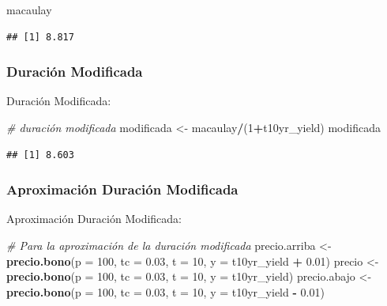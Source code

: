 \documentclass[12pt,]{book}
\newenvironment{Shaded}{\begin{snugshade}}{\end{snugshade}}
\newcommand{\KeywordTok}[1]{\textcolor[rgb]{0.13,0.29,0.53}{\textbf{#1}}}
\newcommand{\DataTypeTok}[1]{\textcolor[rgb]{0.13,0.29,0.53}{#1}}
\newcommand{\DecValTok}[1]{\textcolor[rgb]{0.00,0.00,0.81}{#1}}
\newcommand{\FloatTok}[1]{\textcolor[rgb]{0.00,0.00,0.81}{#1}}
\newcommand{\StringTok}[1]{\textcolor[rgb]{0.31,0.60,0.02}{#1}}
\newcommand{\CommentTok}[1]{\textcolor[rgb]{0.56,0.35,0.01}{\textit{#1}}}
\newcommand{\OperatorTok}[1]{\textcolor[rgb]{0.81,0.36,0.00}{\textbf{#1}}}
\newcommand{\NormalTok}[1]{#1}
\begin{document}
\begin{Shaded}
\begin{Highlighting}[]
\NormalTok{macaulay}
\end{Highlighting}
\end{Shaded}

\begin{verbatim}
## [1] 8.817
\end{verbatim}

\subsubsection{Duración Modificada}\label{duracion-modificada}

Duración Modificada:

\begin{Shaded}
\begin{Highlighting}[]
\CommentTok{# duración modificada}
\NormalTok{modificada <-}\StringTok{ }\NormalTok{macaulay}\OperatorTok{/}\NormalTok{(}\DecValTok{1}\OperatorTok{+}\NormalTok{t10yr_yield)}
\NormalTok{modificada }
\end{Highlighting}
\end{Shaded}

\begin{verbatim}
## [1] 8.603
\end{verbatim}

\subsubsection{Aproximación Duración
Modificada}\label{aproximacion-duracion-modificada}

Aproximación Duración Modificada:

\begin{Shaded}
\begin{Highlighting}[]
\CommentTok{# Para la aproximación de la duración modificada}
\NormalTok{precio.arriba <-}\StringTok{ }\KeywordTok{precio.bono}\NormalTok{(}\DataTypeTok{p =} \DecValTok{100}\NormalTok{, }\DataTypeTok{tc =} \FloatTok{0.03}\NormalTok{, }\DataTypeTok{t =} \DecValTok{10}\NormalTok{, }\DataTypeTok{y =}\NormalTok{ t10yr_yield }\OperatorTok{+}\StringTok{ }\FloatTok{0.01}\NormalTok{)}
\NormalTok{precio        <-}\StringTok{ }\KeywordTok{precio.bono}\NormalTok{(}\DataTypeTok{p =} \DecValTok{100}\NormalTok{, }\DataTypeTok{tc =} \FloatTok{0.03}\NormalTok{, }\DataTypeTok{t =} \DecValTok{10}\NormalTok{, }\DataTypeTok{y =}\NormalTok{ t10yr_yield)}
\NormalTok{precio.abajo  <-}\StringTok{ }\KeywordTok{precio.bono}\NormalTok{(}\DataTypeTok{p =} \DecValTok{100}\NormalTok{, }\DataTypeTok{tc =} \FloatTok{0.03}\NormalTok{, }\DataTypeTok{t =} \DecValTok{10}\NormalTok{, }\DataTypeTok{y =}\NormalTok{ t10yr_yield }\OperatorTok{-}\StringTok{ }\FloatTok{0.01}\NormalTok{)}
\end{Highlighting}
\end{Shaded}
\end{document}
